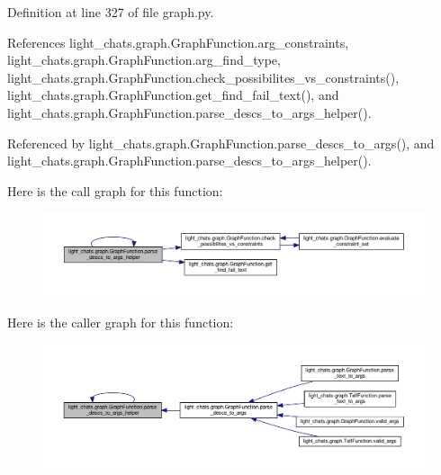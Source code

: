 Definition at line 327 of file graph.\+py.



References light\+\_\+chats.\+graph.\+Graph\+Function.\+arg\+\_\+constraints, light\+\_\+chats.\+graph.\+Graph\+Function.\+arg\+\_\+find\+\_\+type, light\+\_\+chats.\+graph.\+Graph\+Function.\+check\+\_\+possibilites\+\_\+vs\+\_\+constraints(), light\+\_\+chats.\+graph.\+Graph\+Function.\+get\+\_\+find\+\_\+fail\+\_\+text(), and light\+\_\+chats.\+graph.\+Graph\+Function.\+parse\+\_\+descs\+\_\+to\+\_\+args\+\_\+helper().



Referenced by light\+\_\+chats.\+graph.\+Graph\+Function.\+parse\+\_\+descs\+\_\+to\+\_\+args(), and light\+\_\+chats.\+graph.\+Graph\+Function.\+parse\+\_\+descs\+\_\+to\+\_\+args\+\_\+helper().

Here is the call graph for this function\+:
\nopagebreak
\begin{figure}[H]
\begin{center}
\leavevmode
\includegraphics[width=350pt]{classlight__chats_1_1graph_1_1GraphFunction_a33a25a071385ffbd0a222cab65c543d4_cgraph}
\end{center}
\end{figure}
Here is the caller graph for this function\+:
\nopagebreak
\begin{figure}[H]
\begin{center}
\leavevmode
\includegraphics[width=350pt]{classlight__chats_1_1graph_1_1GraphFunction_a33a25a071385ffbd0a222cab65c543d4_icgraph}
\end{center}
\end{figure}
\mbox{\label{classlight__chats_1_1graph_1_1GraphFunction_a3b6764b365baf7471e53651adf83706b}} 
